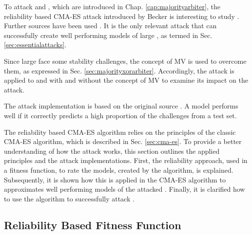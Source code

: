 To attack \mpufs and \mxpufs, which are introduced in Chap. \ref{cap:majorityarbiter}, the reliability based \ac{CMA-ES} attack introduced by Becker is interesting to study \cite{Becker2015ThePUFs}.
Further sources have been used \cite{Becker2015ThePUFs,Wikipedia2017CMA-ES, Hansen2011TheTutorial, Hansen2006TheReview}. %
It is the only relevant attack that can successfully create well performing models of large \xpufs, as termed in Sec. \ref{sec:essentialattacks}.

Since large \xpufs face some stability challenges, the concept of \ac{MV} is used to overcome them, as expressed in Sec. \ref{sec:majorityxorarbiter}.
Accordingly, the attack is applied to \apufs and \xpufs with and without the concept of \ac{MV} to examine its impact on the attack. %

The attack implementation is based on the original source \cite{Becker2015ThePUFs}.
A model performs well if it correctly predicts a high proportion of the challenges from a test set.

The reliability based \ac{CMA-ES} algorithm relies on the principles of the classic \ac{CMA-ES} algorithm, which is described in Sec. \ref{sec:cma-es}.
To provide a better understanding of how the attack works, this section outlines the applied principles and the attack implementations. %
First, the reliability approach, used in a fitness function, to rate the models, created by the algorithm, is explained.
Subsequently, it is shown how this is applied in the \ac{CMA-ES} algorithm to approximates well performing models of the attacked \apuf.
Finally, it is clarified how to use the algorithm to successfully attack \xpufs.


\subsection{Reliability Based Fitness Function}
\label{sec:reliability}

